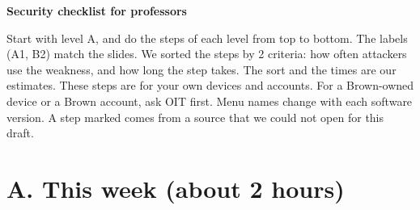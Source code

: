 \documentclass[10pt]{article}
\begin{document}
\footnotesize

{\LARGE\sffamily\bfseries\color{brownred} Security checklist for professors}\par
\smallskip
Start with level A, and do the steps of each level from top to bottom. The labels (A1, B2) match the slides. We sorted the steps by 2 criteria: how often attackers use the weakness, and how long the step takes. The sort and the times are our estimates. These steps are for your own devices and accounts. For a Brown-owned device or a Brown account, ask OIT first. Menu names change with each software version.\ifdefined\hideverify\else{} A step marked \vfy{} comes from a source that we could not open for this draft.\fi

\section{A. This week (about 2 hours)}
\end{document}
